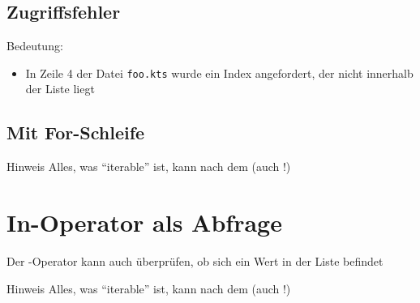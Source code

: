\subsection{Zugriffsfehler}\label{subsec:zugriffsfehler}
\begin{frame}[fragile]
    \slidehead
    \pause
    Bedeutung:
    \begin{itemize}
        \item In Zeile 4 der Datei \texttt{foo.kts} wurde ein Index angefordert, der nicht innerhalb der Liste liegt
    \end{itemize}
\end{frame}

\subsection{Mit For-Schleife}
\begin{frame}
    \slidehead
    \pause
    \begin{block}{Hinweis}
        Alles, was \enquote{iterable} ist, kann nach dem  (auch !)
    \end{block}
\end{frame}

\livecoding

\section{In-Operator als Abfrage}\label{sec:in-operator-als-abfrage}

\begin{frame}
    \slidehead
    Der -Operator kann auch überprüfen, ob sich ein Wert in der Liste befindet
    \pause
    \pause
    \begin{block}{Hinweis}
        Alles, was \enquote{iterable} ist, kann nach dem  (auch !)
    \end{block}
    \pause
\end{frame}

